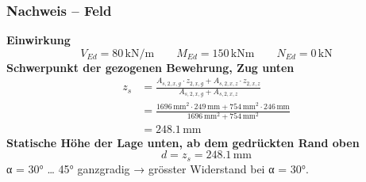 \documentclass[11pt,a4paper]{article}
\begin{document}
\subsubsection{Nachweis – Feld}
\noindent\textbf{Einwirkung}
\begin{equation*}
V_{Ed} = 80\,\mathrm{kN}/\mathrm{m} \qquad M_{Ed} = 150\,\mathrm{kNm} \qquad N_{Ed} = 0\,\mathrm{kN}
\end{equation*}
\noindent\textbf{Schwerpunkt der gezogenen Bewehrung, Zug unten}
\begin{equation*}
\begin{aligned}
  z_s &= \frac{A_{s,2,x,g} \cdot z_{2,x,g} + A_{s,2,x,z} \cdot z_{2,x,z}}{A_{s,2,x,g} + A_{s,2,x,z}} \\
  &= \frac{1696\,\mathrm{mm}^{2} \cdot 249\,\mathrm{mm} + 754\,\mathrm{mm}^{2} \cdot 246\,\mathrm{mm}}{1696\,\mathrm{mm}^{2} + 754\,\mathrm{mm}^{2}} \\
  &= 248.1\,\mathrm{mm}
\end{aligned}
\end{equation*}
\noindent\textbf{Statische Höhe der Lage unten, ab dem gedrückten Rand oben}
\begin{equation*}
d = z_s = 248.1\,\mathrm{mm}
\end{equation*}
α = 30° … 45° ganzgradig → grösster Widerstand bei α = 30°.
\end{document}
